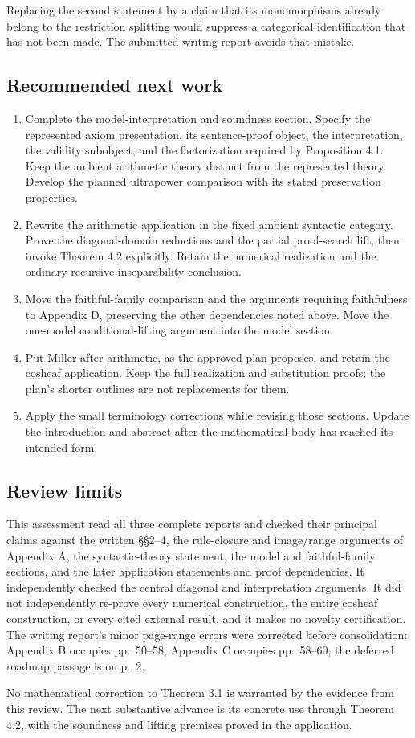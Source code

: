 \documentclass[
  10pt,
  letterpaper,
]{article}
\providecommand{\tightlist}{%
  \setlength{\itemsep}{0pt}\setlength{\parskip}{0pt}}
\begin{document}
Replacing the second statement by a claim that its monomorphisms already
belong to the restriction splitting would suppress a categorical
identification that has not been made. The submitted writing report
avoids that mistake.

\subsection{Recommended next work}\label{recommended-next-work}

\begin{enumerate}
\def\labelenumi{\arabic{enumi}.}
\tightlist
\item
  Complete the model-interpretation and soundness section. Specify the
  represented axiom presentation, its sentence-proof object, the
  interpretation, the validity subobject, and the factorization required
  by Proposition 4.1. Keep the ambient arithmetic theory distinct from
  the represented theory. Develop the planned ultrapower comparison with
  its stated preservation properties.
\item
  Rewrite the arithmetic application in the fixed ambient syntactic
  category. Prove the diagonal-domain reductions and the partial
  proof-search lift, then invoke Theorem 4.2 explicitly. Retain the
  numerical realization and the ordinary recursive-inseparability
  conclusion.
\item
  Move the faithful-family comparison and the arguments requiring
  faithfulness to Appendix D, preserving the other dependencies noted
  above. Move the one-model conditional-lifting argument into the model
  section.
\item
  Put Miller after arithmetic, as the approved plan proposes, and retain
  the cosheaf application. Keep the full realization and substitution
  proofs; the plan's shorter outlines are not replacements for them.
\item
  Apply the small terminology corrections while revising those sections.
  Update the introduction and abstract after the mathematical body has
  reached its intended form.
\end{enumerate}

\subsection{Review limits}\label{review-limits}

This assessment read all three complete reports and checked their
principal claims against the written §§2--4, the rule-closure and
image/range arguments of Appendix A, the syntactic-theory statement, the
model and faithful-family sections, and the later application statements
and proof dependencies. It independently checked the central diagonal
and interpretation arguments. It did not independently re-prove every
numerical construction, the entire cosheaf construction, or every cited
external result, and it makes no novelty certification. The writing
report's minor page-range errors were corrected before consolidation:
Appendix B occupies pp.~50--58; Appendix C occupies pp.~58--60; the
deferred roadmap passage is on p.~2.

No mathematical correction to Theorem 3.1 is warranted by the evidence
from this review. The next substantive advance is its concrete use
through Theorem 4.2, with the soundness and lifting premises proved in
the application.
\end{document}
